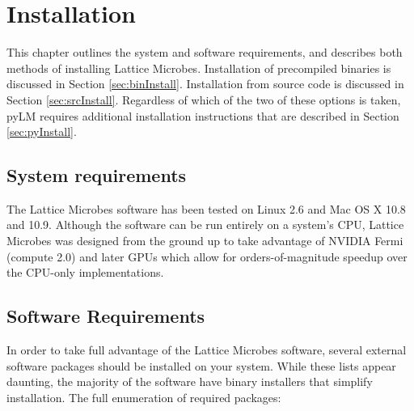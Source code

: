 \chapter{Installation}

This chapter outlines the system and software requirements, and describes both methods of installing Lattice Microbes.  Installation of precompiled binaries is discussed in Section \ref{sec:binInstall}. Installation from source code is discussed in Section \ref{sec:srcInstall}.  Regardless of which of the two of these options is taken, pyLM requires additional installation instructions that are described in Section \ref{sec:pyInstall}.

\section{System requirements} \label{sec:sysreq}

The Lattice Microbes software has been tested on Linux 2.6 and Mac OS X
10.8 and 10.9.  Although the software can be run entirely on a system's
CPU, Lattice Microbes was designed from the ground up to take advantage of
NVIDIA Fermi (compute 2.0) and later GPUs which allow for
orders-of-magnitude speedup over the CPU-only implementations.\\

\section{Software Requirements} \label{sec:softwarereq}

In order to take full advantage of the Lattice Microbes software, several external software packages should be installed on your system. While these lists appear daunting, the majority of the software have binary installers that simplify installation. The full enumeration of required packages:

